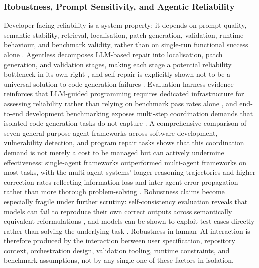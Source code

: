\subsubsection{Robustness, Prompt Sensitivity, and Agentic Reliability}
\label{sec:hai-robustness}
Developer-facing reliability is a system property: it depends on prompt quality, semantic stability, retrieval, localisation, patch generation, validation, runtime behaviour, and benchmark validity, rather than on single-run functional success alone \cite{xia_agentless_2024,olausson_is_2024,agarwal_copilot_2024,liu_e2edev_2026}. Agentless decomposes LLM-based repair into localisation, patch generation, and validation stages, making each stage a potential reliability bottleneck in its own right \cite{xia_agentless_2024}, and self-repair is explicitly shown not to be a universal solution to code-generation failures \cite{olausson_is_2024}. Evaluation-harness evidence reinforces that LLM-guided programming requires dedicated infrastructure for assessing reliability rather than relying on benchmark pass rates alone \cite{agarwal_copilot_2024}, and end-to-end development benchmarking exposes multi-step coordination demands that isolated code-generation tasks do not capture \cite{liu_e2edev_2026}. A comprehensive comparison of seven general-purpose agent frameworks across software development, vulnerability detection, and program repair tasks shows that this coordination demand is not merely a cost to be managed but can actively undermine effectiveness: single-agent frameworks outperformed multi-agent frameworks on most tasks, with the multi-agent systems' longer reasoning trajectories and higher correction rates reflecting information loss and inter-agent error propagation rather than more thorough problem-solving \cite{yin_comprehensive_2025}. Robustness claims become especially fragile under further scrutiny: self-consistency evaluation reveals that models can fail to reproduce their own correct outputs across semantically equivalent reformulations \cite{min_beyond_2024}, and models can be shown to exploit test cases directly rather than solving the underlying task \cite{zhong_impossiblebench_2025}. Robustness in human--AI interaction is therefore produced by the interaction between user specification, repository context, orchestration design, validation tooling, runtime constraints, and benchmark assumptions, not by any single one of these factors in isolation.

